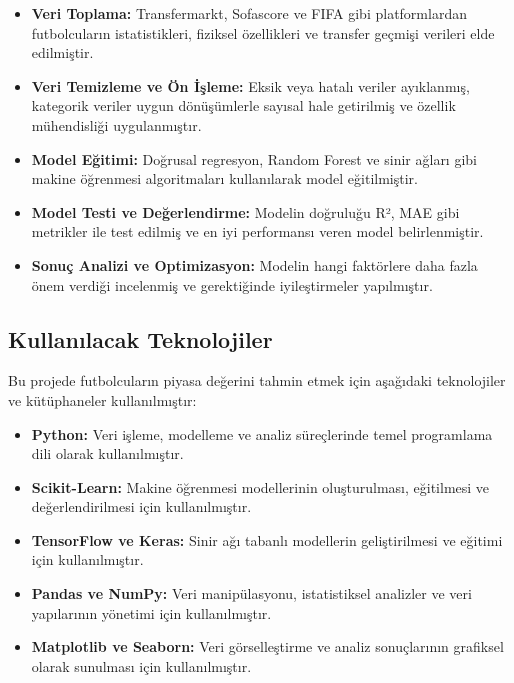 \documentclass{article}
\begin{document}
\begin{itemize}
    \item \textbf{Veri Toplama:} Transfermarkt, Sofascore ve FIFA gibi platformlardan futbolcuların istatistikleri, fiziksel özellikleri ve transfer geçmişi verileri elde edilmiştir.
    \item \textbf{Veri Temizleme ve Ön İşleme:} Eksik veya hatalı veriler ayıklanmış, kategorik veriler uygun dönüşümlerle sayısal hale getirilmiş ve özellik mühendisliği uygulanmıştır.
    \item \textbf{Model Eğitimi:} Doğrusal regresyon, Random Forest ve sinir ağları gibi makine öğrenmesi algoritmaları kullanılarak model eğitilmiştir.
    \item \textbf{Model Testi ve Değerlendirme:} Modelin doğruluğu R², MAE gibi metrikler ile test edilmiş ve en iyi performansı veren model belirlenmiştir.
    \item \textbf{Sonuç Analizi ve Optimizasyon:} Modelin hangi faktörlere daha fazla önem verdiği incelenmiş ve gerektiğinde iyileştirmeler yapılmıştır.
\end{itemize}



\subsection{Kullanılacak Teknolojiler}

Bu projede futbolcuların piyasa değerini tahmin etmek için aşağıdaki teknolojiler ve kütüphaneler kullanılmıştır:

\begin{itemize}
    \item \textbf{Python:} Veri işleme, modelleme ve analiz süreçlerinde temel programlama dili olarak kullanılmıştır.
    \item \textbf{Scikit-Learn:} Makine öğrenmesi modellerinin oluşturulması, eğitilmesi ve değerlendirilmesi için kullanılmıştır.
    \item \textbf{TensorFlow ve Keras:} Sinir ağı tabanlı modellerin geliştirilmesi ve eğitimi için kullanılmıştır.
    \item \textbf{Pandas ve NumPy:} Veri manipülasyonu, istatistiksel analizler ve veri yapılarının yönetimi için kullanılmıştır.
    \item \textbf{Matplotlib ve Seaborn:} Veri görselleştirme ve analiz sonuçlarının grafiksel olarak sunulması için kullanılmıştır.
\end{itemize}
\end{document}
